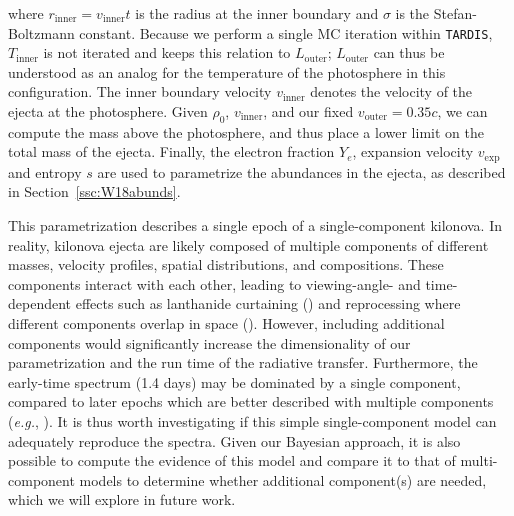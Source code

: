 \documentclass[twocolumn, twocolappendix]{aastex63}
\def\TARDIS{\texttt{TARDIS}}
\def\eg{{\it e.g.}}
\begin{document}
\noindent where $r_{\mathrm{inner}} = v_{\mathrm{inner}} t$ is the radius at the inner boundary and $\sigma$ is the Stefan-Boltzmann constant. Because we perform a single MC iteration within \TARDIS, $T_{\mathrm{inner}}$ is not iterated and keeps this relation to $L_{\mathrm{outer}}$; $L_{\mathrm{outer}}$ can thus be understood as an analog for the temperature of the photosphere in this configuration. The inner boundary velocity $v_{\mathrm{inner}}$ denotes the velocity of the ejecta at the photosphere. Given $\rho_0$, $v_{\mathrm{inner}}$, and our fixed $v_{\mathrm{outer}} = 0.35c$, we can compute the mass above the photosphere, and thus place a lower limit on the total mass of the ejecta. Finally, the electron fraction $Y_e$, expansion velocity $v_{\mathrm{exp}}$ and entropy $s$ are used to parametrize the abundances in the ejecta, as described in Section~\ref{ssc:W18abunds}.


This parametrization describes a single epoch of a single-component kilonova. In reality, kilonova ejecta are likely composed of multiple components of different masses, velocity profiles, spatial distributions, and compositions. These components interact with each other, leading to viewing-angle- and time-dependent effects such as lanthanide curtaining (\citealt{kasen15, wollaeger18, darbha20, nativi21}) and reprocessing where different components overlap in space (\citealt{kawaguchi20, korobkin21}). However, including additional components would significantly increase the dimensionality of our parametrization and the run time of the radiative transfer. Furthermore, the early-time spectrum (1.4 days) may be dominated by a single component, compared to later epochs which are better described with multiple components (\eg, \citealt{kasen17}). It is thus worth investigating if this simple single-component model can adequately reproduce the spectra. Given our Bayesian approach, it is also possible to compute the evidence of this model and compare it to that of multi-component models to determine whether additional component(s) are needed, which we will explore in future work.
\end{document}
